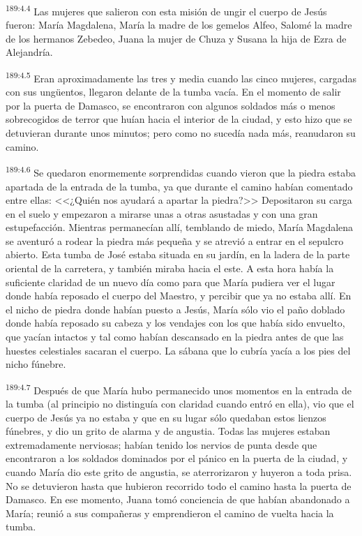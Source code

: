 \par 
\textsuperscript{189:4.4} Las mujeres que salieron con esta misión de ungir el cuerpo de Jesús fueron: María Magdalena, María la madre de los gemelos Alfeo, Salomé la madre de los hermanos Zebedeo, Juana la mujer de Chuza y Susana la hija de Ezra de Alejandría.

\par 
\textsuperscript{189:4.5} Eran aproximadamente las tres y media cuando las cinco mujeres, cargadas con sus ung\"uentos, llegaron delante de la tumba vacía. En el momento de salir por la puerta de Damasco, se encontraron con algunos soldados más o menos sobrecogidos de terror que huían hacia el interior de la ciudad, y esto hizo que se detuvieran durante unos minutos; pero como no sucedía nada más, reanudaron su camino.

\par 
\textsuperscript{189:4.6} Se quedaron enormemente sorprendidas cuando vieron que la piedra estaba apartada de la entrada de la tumba, ya que durante el camino habían comentado entre ellas: <<¿Quién nos ayudará a apartar la piedra?>> Depositaron su carga en el suelo y empezaron a mirarse unas a otras asustadas y con una gran estupefacción. Mientras permanecían allí, temblando de miedo, María Magdalena se aventuró a rodear la piedra más pequeña y se atrevió a entrar en el sepulcro abierto. Esta tumba de José estaba situada en su jardín, en la ladera de la parte oriental de la carretera, y también miraba hacia el este. A esta hora había la suficiente claridad de un nuevo día como para que María pudiera ver el lugar donde había reposado el cuerpo del Maestro, y percibir que ya no estaba allí. En el nicho de piedra donde habían puesto a Jesús, María sólo vio el paño doblado donde había reposado su cabeza y los vendajes con los que había sido envuelto, que yacían intactos y tal como habían descansado en la piedra antes de que las huestes celestiales sacaran el cuerpo. La sábana que lo cubría yacía a los pies del nicho fúnebre.

\par 
\textsuperscript{189:4.7} Después de que María hubo permanecido unos momentos en la entrada de la tumba (al principio no distinguía con claridad cuando entró en ella), vio que el cuerpo de Jesús ya no estaba y que en su lugar sólo quedaban estos lienzos fúnebres, y dio un grito de alarma y de angustia. Todas las mujeres estaban extremadamente nerviosas; habían tenido los nervios de punta desde que encontraron a los soldados dominados por el pánico en la puerta de la ciudad, y cuando María dio este grito de angustia, se aterrorizaron y huyeron a toda prisa. No se detuvieron hasta que hubieron recorrido todo el camino hasta la puerta de Damasco. En ese momento, Juana tomó conciencia de que habían abandonado a María; reunió a sus compañeras y emprendieron el camino de vuelta hacia la tumba.


